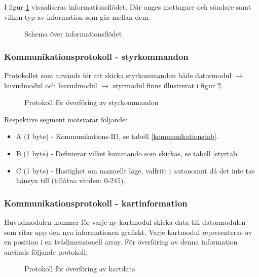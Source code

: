 \documentclass[11pt]{article}
\begin{document}
\begin{flushleft}
I figur \ref{informationFlow} visualiseras informationsflödet. Där anges mottagare och sändare samt vilken typ av information som går mellan dem.

\begin{figure}[htbp]
\centering
\noindent\resizebox{1\linewidth}{!}{
	}
	\caption{Schema över informationsflödet\label{informationFlow}}	
\end{figure}

\subsubsection{Kommunikationsprotokoll - styrkommandon}
Protokollet som används för att skicka styrkommandon både datormodul $\rightarrow$ huvudmodul och huvudmodul $\rightarrow$ styrmodul finns illustrerat i figur \ref{styrdata}.

\begin{figure}[htbp]
\centering
\noindent\resizebox{.8\linewidth}{!}{
	}
	\caption{Protokoll för överföring av styrkommandon\label{styrdata}}	
\end{figure}

Respektive segment motsvarar följande: 
\begin{itemize}
	\item A (1 byte) - Kommunikations-ID, se tabell \ref{kommunikationstab}.
	\item B (1 byte) - Definierar vilket kommando som skickas, se tabell \ref{styrtab}.
	\item C (1 byte) - Hastighet om manuellt läge, valfritt i autonomnt då det inte tas hänsyn till (tillåtna värden: 0-245).
\end{itemize}

\subsubsection{Kommunikationsprotokoll - kartinformation}
Huvudmodulen kommer för varje ny kartmodul skicka data till datormodulen som ritar upp den nya informationen grafiskt. Varje kartmodul representeras av en position i en tvådimensionell array. För överföring av denna information används följande protokoll:

 \begin{figure}[H]
\centering
\noindent\resizebox{.8\linewidth}{!}{
	}
	\caption{Protokoll för överföring av kartdata \label{kartdata}}	
\end{figure} 


\end{flushleft}
\end{document}
